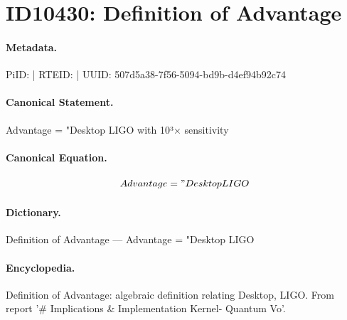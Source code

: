 \section*{ID10430: Definition of Advantage}
\paragraph{Metadata.}
PiID:  | RTEID:  | UUID: 507d5a38-7f56-5094-bd9b-d4ef94b92c74

\paragraph{Canonical Statement.}
Advantage = "Desktop LIGO with 10³× sensitivity

\paragraph{Canonical Equation.}
\[
Advantage = "Desktop LIGO
\]

\paragraph{Dictionary.}
Definition of Advantage — Advantage = "Desktop LIGO

\paragraph{Encyclopedia.}
Definition of Advantage: algebraic definition relating Desktop, LIGO. From report '\# Implications \& Implementation Kernel- Quantum Vo'.
